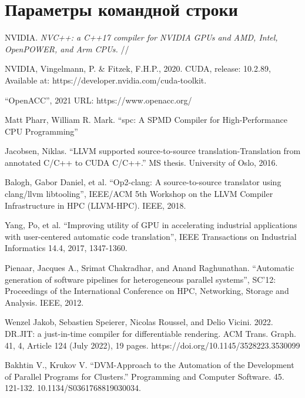 \documentclass[11pt,fleqn,english,russian]{report} %
\begin{document}

\chapter{Параметры командной строки}

\begin{thebibliography}{10}
	
	 NVIDIA. \textit{NVC++: a C++17 compiler for NVIDIA GPUs and AMD, Intel, OpenPOWER, and Arm CPUs.} // 	
	
	 NVIDIA, Vingelmann, P. \& Fitzek, F.H.P., 2020. CUDA, release: 10.2.89, Available at: https://developer.nvidia.com/cuda-toolkit.	
	
	 ``OpenACC'', 2021 URL: https://www.openacc.org/
	
	 Matt Pharr, William R. Mark. ``spc: A SPMD Compiler for High-Performance CPU Programming''
	
	 Jacobsen, Niklas. ``LLVM supported source-to-source translation-Translation from annotated C/C++ to CUDA C/C++.'' MS thesis. University of Oslo, 2016. 
	
	 Balogh, Gabor Daniel, et al. ``Op2-clang: A source-to-source translator using clang/llvm libtooling'', IEEE/ACM 5th Workshop on the LLVM Compiler Infrastructure in HPC (LLVM-HPC). IEEE, 2018. 
	
	 Yang, Po, et al. ``Improving utility of GPU in accelerating industrial applications with user-centered automatic code translation'', IEEE Transactions on Industrial Informatics 14.4, 2017, 1347-1360. 
	
	 Pienaar, Jacques A., Srimat Chakradhar, and Anand Raghunathan. ``Automatic generation of software pipelines for heterogeneous parallel systems'', SC'12: Proceedings of the International Conference on HPC, Networking, Storage and Analysis. IEEE, 2012. 	
	
	 Wenzel Jakob, Sebastien Speierer, Nicolas Roussel, and Delio Vicini. 2022. DR.JIT: a just-in-time compiler for differentiable rendering. ACM Trans. Graph. 41, 4, Article 124 (July 2022), 19 pages. https://doi.org/10.1145/3528223.3530099
	
	 Bakhtin V., Krukov V. ``DVM-Approach to the Automation of the Development of Parallel Programs for Clusters.'' Programming and Computer Software. 45. 121-132. 10.1134/S0361768819030034. 
	

\end{thebibliography}
\end{document}
